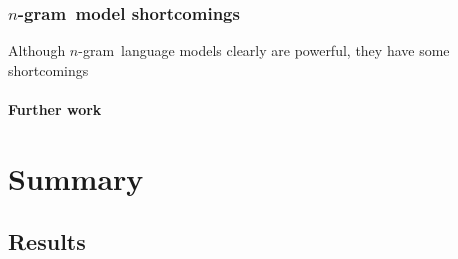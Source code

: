\documentclass[a4paper,11pt]{kth-mag}
\newcommand{\ngram}{$n$-gram}
\begin{document}



\subsection{\ngram~model shortcomings}
Although \ngram~language models clearly are powerful, they have some shortcomings



\subsubsection{Further work}










\chapter{Summary}

\section{Results}
\end{document}
